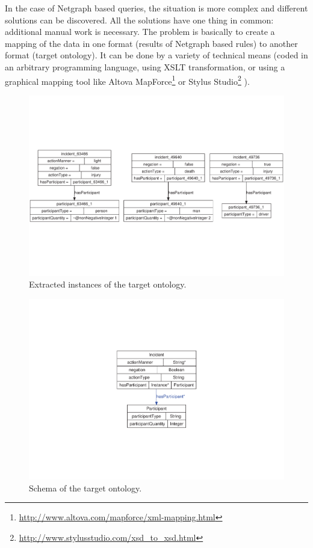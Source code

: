 In the case of Netgraph based queries, the situation is more complex and different solutions can be discovered. All the solutions have one thing in common: additional manual work is necessary. The problem is basically to create a mapping of the data in one format (results of Netgraph based rules) to another format (target ontology). It can be done by a variety of technical means (coded in an arbitrary programming language, using XSLT transformation, or using a graphical mapping tool like 
Altova MapForce\footnote{\url{http://www.altova.com/mapforce/xml-mapping.html}}
or
Stylus Studio\footnote{\url{http://www.stylusstudio.com/xsd_to_xsd.html}}
). 



\begin{figure}
	\centering
		\includegraphics[angle=-90, width=\hsize]{instances}
	\caption{Extracted instances of the target ontology.}
	\label{fig:manual_instatnces}
\end{figure}


\begin{figure}
\vspace{-0.3cm}
	\centering
		\includegraphics[angle=-90, width=\hsize]{classes}
	\caption{Schema of the target ontology.}
	\label{fig:manual_classes}
\end{figure}



